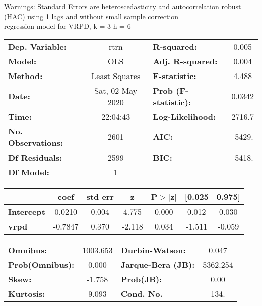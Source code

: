 Warnings: \newline
 [1] Standard Errors are heteroscedasticity and autocorrelation robust (HAC) using 1 lags and without small sample correction\\ 

regression model for VRPD, k = 3 h = 6\begin{center}
\begin{tabular}{lclc}
\toprule
\textbf{Dep. Variable:}    &       rtrn       & \textbf{  R-squared:         } &     0.005   \\
\textbf{Model:}            &       OLS        & \textbf{  Adj. R-squared:    } &     0.004   \\
\textbf{Method:}           &  Least Squares   & \textbf{  F-statistic:       } &     4.488   \\
\textbf{Date:}             & Sat, 02 May 2020 & \textbf{  Prob (F-statistic):} &   0.0342    \\
\textbf{Time:}             &     22:04:43     & \textbf{  Log-Likelihood:    } &    2716.7   \\
\textbf{No. Observations:} &        2601      & \textbf{  AIC:               } &    -5429.   \\
\textbf{Df Residuals:}     &        2599      & \textbf{  BIC:               } &    -5418.   \\
\textbf{Df Model:}         &           1      & \textbf{                     } &             \\
\bottomrule
\end{tabular}
\begin{tabular}{lcccccc}
                   & \textbf{coef} & \textbf{std err} & \textbf{z} & \textbf{P$> |$z$|$} & \textbf{[0.025} & \textbf{0.975]}  \\
\midrule
\textbf{Intercept} &       0.0210  &        0.004     &     4.775  &         0.000        &        0.012    &        0.030     \\
\textbf{vrpd}      &      -0.7847  &        0.370     &    -2.118  &         0.034        &       -1.511    &       -0.059     \\
\bottomrule
\end{tabular}
\begin{tabular}{lclc}
\textbf{Omnibus:}       & 1003.653 & \textbf{  Durbin-Watson:     } &    0.047  \\
\textbf{Prob(Omnibus):} &   0.000  & \textbf{  Jarque-Bera (JB):  } & 5362.254  \\
\textbf{Skew:}          &  -1.758  & \textbf{  Prob(JB):          } &     0.00  \\
\textbf{Kurtosis:}      &   9.093  & \textbf{  Cond. No.          } &     134.  \\
\bottomrule
\end{tabular}
\end{center}


